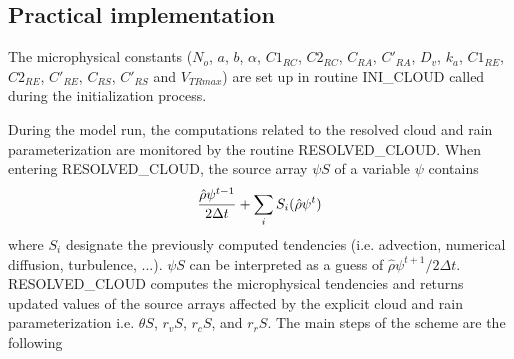 \subsection{Practical implementation}

The microphysical constants ($N_o$, $a$, $b$, $\alpha$, $C1_{RC}$, $C2_{RC}$,
$C_{RA}$, $C'_{RA}$, $D_v$, $k_a$, $C1_{RE}$, $C2_{RE}$, $C'_{RE}$, $C_{RS}$,
$C'_{RS}$ and $V_{TRmax}$) are set up in  routine INI\_CLOUD called during the
initialization process.

During the model run,  the computations related to the resolved cloud and rain
parameterization are  monitored by the routine RESOLVED\_CLOUD. When entering
RESOLVED\_CLOUD, the source array $\psi S$ of a variable $\psi$ contains
$$ {\hat \rho \psi^{t-1} \over {2 \Delta t}} + \sum_i S_i(\hat \rho \psi^t) $$
where  $S_i$ designate the previously computed tendencies (i.e. advection,
numerical diffusion, turbulence, ...). $\psi S$ can be interpreted as a guess
of $\hat \rho \psi^{t+1} / 2 \Delta t$.  RESOLVED\_CLOUD computes the
microphysical tendencies and returns updated
values of the source arrays affected by the explicit cloud and rain
parameterization i.e. $\theta S$, $r_v S$, $r_c S$, and $r_r S$. The main steps
of the scheme are the following

